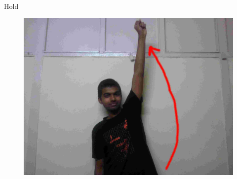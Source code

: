 \documentclass{beamer}
\begin{document}
\begin{frame}{Hold}
  \begin{figure}
      \centering
      \includegraphics[scale = .08]{gestures/hold.jpg} 
  \end{figure}
\end{frame}
\end{document}
